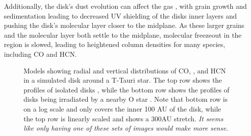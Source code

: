 Additionally, the disk's dust evolution can affect the gas \citep{Fogel2011,Akimkin2013}, with grain growth and sedimentation leading to decreased UV shielding of the disks inner layers and pushing the disk's molecular layer closer to the midplane. As these larger grains and the molecular layer both settle to the midplane, molecular freezeout in the region is slowed, leading to heightened column densities for many species, including CO and HCN.



\begin{figure}[t]
  \hspace*{\fill}%
  \vfill%
  \hspace*{\fill}%
  \caption{Models showing radial and vertical distributions of CO, \hco, and HCN in a simulated disk around a T-Tauri star. The top row shows the profiles of isolated disks \citep{Walsh2010}, while the bottom row shows the profiles of disks being irradiated by a nearby O star \citep{Walsh2013}. Note that bottom row is on a log scale and only covers the inner 100 AU of the disk, while the top row is linearly scaled and shows a 300AU stretch. \textit{It seems like only having one of these sets of images would make more sense.}}
  \label{fig:walsh-abundance-profs}
\end{figure}





